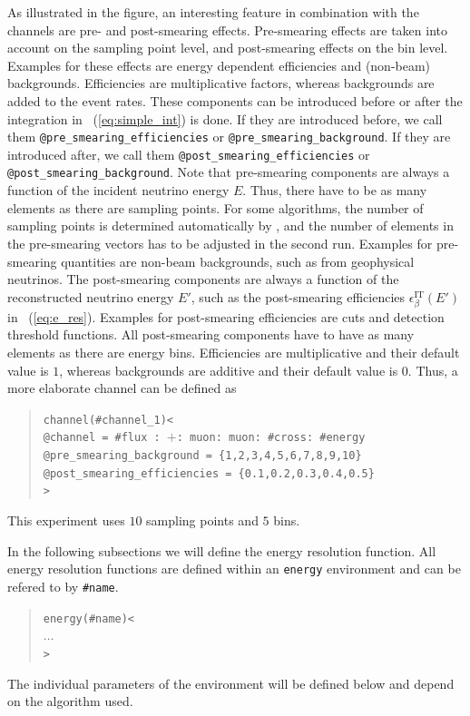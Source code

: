 As illustrated in the figure, an interesting feature in combination with the
channels are pre- and post-smearing effects. Pre-smearing effects are taken into account on the sampling point level, and post-smearing effects on the bin level. Examples for these effects are energy 
dependent efficiencies and (non-beam) backgrounds. Efficiencies are multiplicative factors, whereas backgrounds are added to the event rates. These components can be introduced before or after the integration in \eq~(\ref{eq:simple_int}) is done. If they are introduced before, 
we call them
{\tt @pre\_smearing\_efficiencies} or {\tt @pre\_smearing\_background}. 
If they are introduced after, we call them {\tt @post\_smearing\_efficiencies} or {\tt @post\_smearing\_background}.
Note that pre-smearing components are always a function of the incident neutrino energy $E$. Thus, there have to be as  many elements as there are sampling points. For some algorithms, the number of sampling points is determined automatically by \GLOBES , and the number of elements in the  pre-smearing vectors has to be adjusted in the second run.
Examples for pre-smearing quantities are non-beam backgrounds, such as from geophysical neutrinos. The post-smearing components are always a function of the reconstructed neutrino energy $E'$, such as the post-smearing efficiencies $\epsilon_\beta^{\text{IT}}(E')$ in \eq~(\ref{eq:e_res}). Examples for post-smearing efficiencies are cuts and detection threshold functions. All post-smearing components have to have as 
many elements as there are energy bins. Efficiencies are multiplicative 
and their default value is $1$, whereas backgrounds are additive and their default value is $0$. Thus, a more elaborate channel can be defined as
\begin{quote}
{\tt channel(\#channel\_1)<\\
\tb @channel = \#flux : $+$: muon: muon: \#cross: \#energy\\
\tb @pre\_smearing\_background = \{1,2,3,4,5,6,7,8,9,10\}\\
\tb @post\_smearing\_efficiencies = \{0.1,0.2,0.3,0.4,0.5\}\\
>}
\end{quote}
This experiment uses $10$ sampling points and $5$ bins.

In the following subsections we will define the energy resolution function.
All energy resolution functions are defined within an {\tt energy} environment and can be refered to by {\tt \#name}.
\begin{quote}
  {\tt energy(\#name)<\\
\tb $\ldots$\\
>}
\end{quote}
The individual parameters of the environment will be defined below and depend on the algorithm used.

